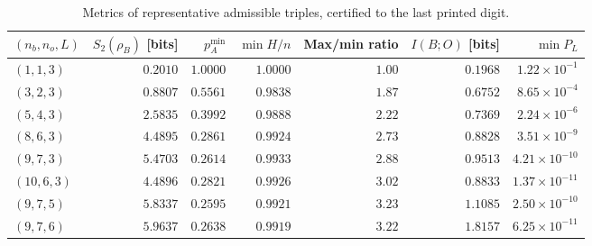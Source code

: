 \documentclass[11pt,a4paper]{article}
\theoremstyle{plain}
\theoremstyle{definition}
\theoremstyle{remark}
\begin{document}
\begin{table}[htbp]
  \centering
  \small
  \caption{Metrics of representative admissible triples, certified to the last printed
    digit.\label{tab:domain-profile}}
  \begin{tabular}{@{}lrrrrrr@{}}
    \toprule
    \((n_b, n_o, L)\) & \(S_2(\rho_B)\) [bits] & \(p_A^{\min}\) & \(\min H/n\) & Max/min ratio & \(I(B; O)\) [bits] & \(\min P_L\) \\
    \midrule
    \((1, 1, 3)\)   & \(0.2010\) & \(1.0000\) & \(1.0000\) & \(1.00\) & \(0.1968\) & \(1.22 \times 10^{-1}\) \\
    \((3, 2, 3)\)   & \(0.8807\) & \(0.5561\) & \(0.9838\) & \(1.87\) & \(0.6752\) & \(8.65 \times 10^{-4}\) \\
    \((5, 4, 3)\)   & \(2.5835\) & \(0.3992\) & \(0.9888\) & \(2.22\) & \(0.7369\) & \(2.24 \times 10^{-6}\) \\
    \((8, 6, 3)\)   & \(4.4895\) & \(0.2861\) & \(0.9924\) & \(2.73\) & \(0.8828\) & \(3.51 \times 10^{-9}\) \\
    \((9, 7, 3)\)   & \(5.4703\) & \(0.2614\) & \(0.9933\) & \(2.88\) & \(0.9513\) & \(4.21 \times 10^{-10}\) \\
    \((10, 6, 3)\)  & \(4.4896\) & \(0.2821\) & \(0.9926\) & \(3.02\) & \(0.8833\) & \(1.37 \times 10^{-11}\) \\
    \((9, 7, 5)\)   & \(5.8337\) & \(0.2595\) & \(0.9921\) & \(3.23\) & \(1.1085\) & \(2.50 \times 10^{-10}\) \\
    \((9, 7, 6)\)   & \(5.9637\) & \(0.2638\) & \(0.9919\) & \(3.22\) & \(1.8157\) & \(6.25 \times 10^{-11}\) \\
    \bottomrule
  \end{tabular}
\end{table}
\end{document}

